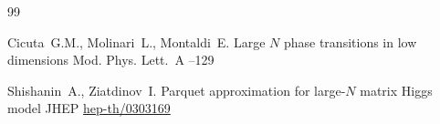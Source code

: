 \begin{thebibliography}{99}
 

\by Cicuta~G.M., Molinari~L., Montaldi~E.
\paper Large $N$ phase transitions in low dimensions
\jour Mod. Phys. Lett.~A
--129



\by Shishanin~A., Ziatdinov~I.
\paper Parquet approximation for large-$N$ matrix Higgs model
\jour JHEP
\arxiv \href{http://arxiv.org/abs/hep-th/0303169}{hep-th/0303169} 

\end{thebibliography}



\hskip6.5cm \thedate \par
\hskip6.5cm\therevdate\par


\makeengtitlem

\newpage

%
